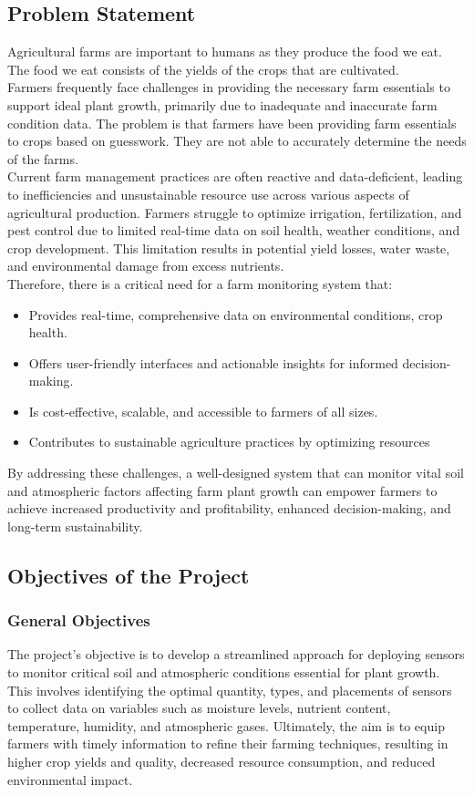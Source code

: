 \documentclass[12pt, a4paper]{article}
\begin{document}
\subsection{Problem Statement}
Agricultural farms are important to humans as they produce the food we eat. The food we eat consists of the yields of the crops that are cultivated.\\ 
Farmers frequently face challenges in providing the necessary farm essentials to support ideal plant growth, primarily due to inadequate and inaccurate farm condition data. The problem is that farmers have been providing farm essentials to crops based on guesswork. They are not able to accurately determine the needs of the farms.
\\
Current farm management practices are often reactive and data-deficient, leading to inefficiencies and unsustainable resource use across various aspects of agricultural production. Farmers struggle to optimize irrigation, fertilization, and pest control due to limited real-time data on soil health, weather conditions, and crop development. This limitation results in potential yield losses, water waste, and environmental damage from excess nutrients.
\\
Therefore, there is a critical need for a farm monitoring system that:
\begin{itemize}
 \item Provides real-time, comprehensive data on environmental conditions, crop health.
 \item Offers user-friendly interfaces and actionable insights for informed decision-making.
 \item Is cost-effective, scalable, and accessible to farmers of all sizes.
 \item Contributes to sustainable agriculture practices by optimizing resources
\end{itemize}
By addressing these challenges, a well-designed system that can monitor vital soil and atmospheric factors affecting farm plant growth can empower farmers to achieve increased productivity and profitability, enhanced decision-making, and long-term sustainability.



\newpage
\subsection{Objectives of the Project}
\subsubsection{General Objectives}
The project's objective is to develop a streamlined approach for deploying sensors to monitor critical soil and atmospheric conditions essential for plant growth. This involves identifying the optimal quantity, types, and placements of sensors to collect data on variables such as moisture levels, nutrient content, temperature, humidity, and atmospheric gases. Ultimately, the aim is to equip farmers with timely information to refine their farming techniques, resulting in higher crop yields and quality, decreased resource consumption, and reduced environmental impact.
\end{document}
